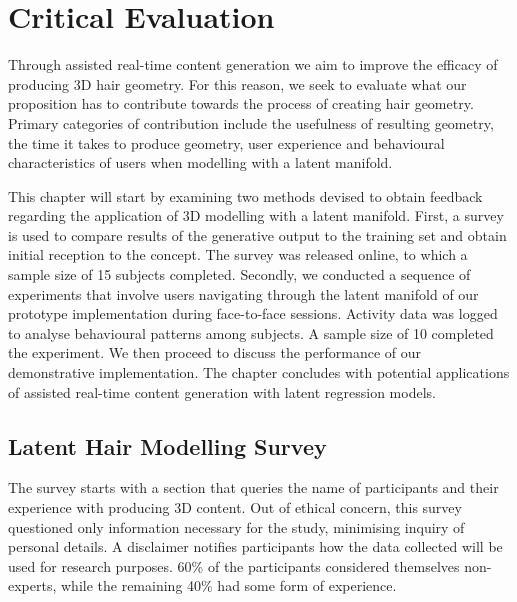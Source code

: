\documentclass[ %
author={Dillon Keith Diep},
supervisor={Dr. Carl Henrik Ek},
degree={MEng},
title={ART-CG Hair:},
subtitle={Assisted Real-time Content Generation of Stylised Virtual Hair},
type={Research},
year={2017} ]{dissertation}
\begin{document}

\chapter{Critical Evaluation}
\label{chap:evaluation}
Through assisted real-time content generation we aim to improve the efficacy of producing 3D hair geometry. For this reason, we seek to evaluate what our proposition has to contribute towards the process of creating hair geometry. Primary categories of contribution include the usefulness of resulting geometry, the time it takes to produce geometry, user experience and behavioural characteristics of users when modelling with a latent manifold.

This chapter will start by examining two methods devised to obtain feedback regarding the application of 3D modelling with a latent manifold. First, a survey is used to compare results of the generative output to the training set and obtain initial reception to the concept. The survey was released online, to which a sample size of 15 subjects completed. Secondly, we conducted a sequence of experiments that involve users navigating through the latent manifold of our prototype implementation during face-to-face sessions. Activity data was logged to analyse behavioural patterns among subjects. A sample size of 10 completed the experiment. We then proceed to discuss the performance of our demonstrative implementation. The chapter concludes with potential applications of assisted real-time content generation with latent regression models.

\section{Latent Hair Modelling Survey}
\label{evaluation:survey}
The survey starts with a section that queries the name of participants and their experience with producing 3D content. Out of ethical concern, this survey questioned only information necessary for the study, minimising inquiry of personal details. A disclaimer notifies participants how the data collected will be used for research purposes. 60\% of the participants considered themselves non-experts, while the remaining 40\% had some form of experience.
\end{document}
